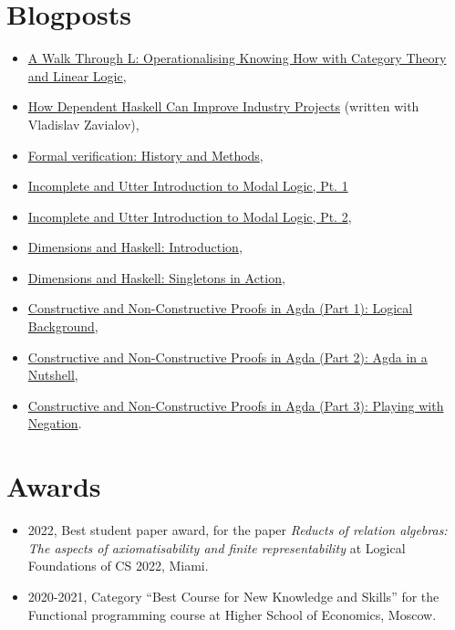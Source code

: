 \documentclass[10pt,a4paper]{article}
\begin{document}
\section{Blogposts}

\begin{itemize}[leftmargin=*]
    \item \href{https://subexponentials.substack.com/p/a-walk-through-l}{A Walk Through L: Operationalising Knowing How with Category Theory and Linear Logic},
    \item \href{https://serokell.io/blog/how-dependent-haskell-can-improve-industry-projects}{How Dependent Haskell Can Improve Industry Projects} (written with Vladislav Zavialov),
    \item \href{https://serokell.io/blog/formal-verification-history}{Formal verification: History and Methods},
    \item \href{https://serokell.io/blog/incomplete-and-utter-introduction-to-modal-logic}{Incomplete and Utter Introduction to Modal Logic, Pt. 1}
    \item \href{https://serokell.io/blog/rapid-introduction-to-modal-logic-2}{Incomplete and Utter Introduction to Modal Logic, Pt. 2},
    \item \href{https://serokell.io/blog/dimensions-and-haskell-introduction}{Dimensions and Haskell: Introduction},
    \item \href{https://serokell.io/blog/dimensions-haskell-singletons}{Dimensions and Haskell: Singletons in Action},
    \item \href{https://serokell.io/blog/logical-background}{Constructive and Non-Constructive Proofs in Agda (Part 1): Logical Background},
    \item \href{https://serokell.io/blog/agda-in-nutshell}{Constructive and Non-Constructive Proofs in Agda (Part 2): Agda in a Nutshell},
    \item  \href{https://serokell.io/blog/playing-with-negation}{Constructive and Non-Constructive Proofs in Agda (Part 3): Playing with Negation}.
\end{itemize}

\section{Awards}

\begin{itemize}[leftmargin=*]
    \item 2022, Best student paper award, for the paper \textit{Reducts of relation algebras: The aspects of axiomatisability and finite representability} at Logical Foundations of CS 2022, Miami.
    \item 2020-2021, Category ``Best Course for New Knowledge and Skills'' for the Functional programming course at Higher School of Economics, Moscow.
\end{itemize}
\end{document}
